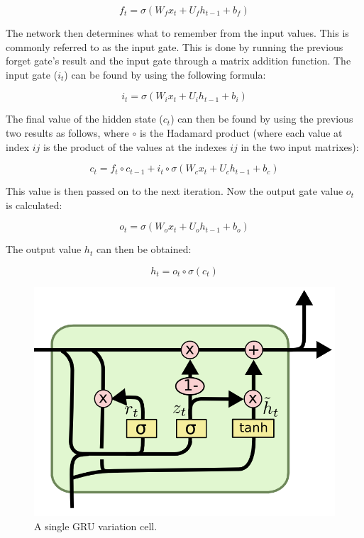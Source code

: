 $$ f_t = \sigma(W_f x_t + U_f h_{t-1} + b_f) $$

The network then determines what to remember from the input values. This is commonly referred to as the input gate. This is done by running the previous forget gate's result and the input gate through a matrix addition function. The input gate ($i_t$) can be found by using the following formula:

$$ i_t = \sigma(W_i x_t + U_i h_{t-1} + b_i) $$

The final value of the hidden state ($c_t$) can then be found by using the previous two results as follows, where $\circ$ is the Hadamard product (where each value at index $ij$ is the product of the values at the indexes $ij$ in the two input matrixes): 

$$ c_t = f_t \circ c_{t-1} + i_t \circ \sigma(W_c x_t + U_c h_{t-1} + b_c) $$

This value is then passed on to the next iteration. Now the output gate value $o_t$ is calculated:

$$ o_t = \sigma(W_o x_t + U_o h_{t-1} + b_o) $$

The output value $h_t$ can then be obtained:

$$ h_t = o_t \circ \sigma(c_t) $$

\begin{figure}
	\begin{center}
		\includegraphics[scale=0.5]{rnn/gru_cell}
	\end{center}
	\caption{A single GRU variation cell.\label{fig:gru_cell}}
\end{figure}

